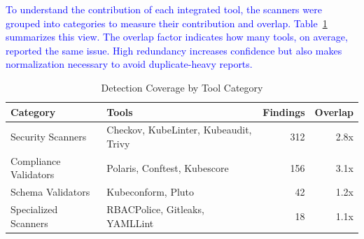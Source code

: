\documentclass[preprint,12pt]{elsarticle}
\newcommand{\new}[1]{\textcolor{blue}{#1}}
\begin{document}
\new{To understand the contribution of each integrated tool, the scanners were grouped into categories to measure their contribution and overlap. Table~\ref{tab:tool_performance} summarizes this view. The overlap factor indicates how many tools, on average, reported the same issue. High redundancy increases confidence but also makes normalization necessary to avoid duplicate-heavy reports.}


\begin{table}[htbp]
\centering
\caption{Detection Coverage by Tool Category}
\label{tab:tool_performance}
\small
\setlength{\tabcolsep}{5pt}
\renewcommand{\arraystretch}{1.1}
\begin{tabular}{lp{4cm}rr}
\hline
\textbf{Category} & \textbf{Tools} & \textbf{Findings} & \textbf{Overlap} \\
\hline
Security Scanners & Checkov, KubeLinter, Kubeaudit, Trivy & 312 & 2.8x \\
Compliance Validators & Polaris, Conftest, Kubescore & 156 & 3.1x \\
Schema Validators & Kubeconform, Pluto & 42 & 1.2x \\
Specialized Scanners & RBACPolice, Gitleaks, YAMLLint & 18 & 1.1x \\
\hline
\end{tabular}
\end{table}
\end{document}

